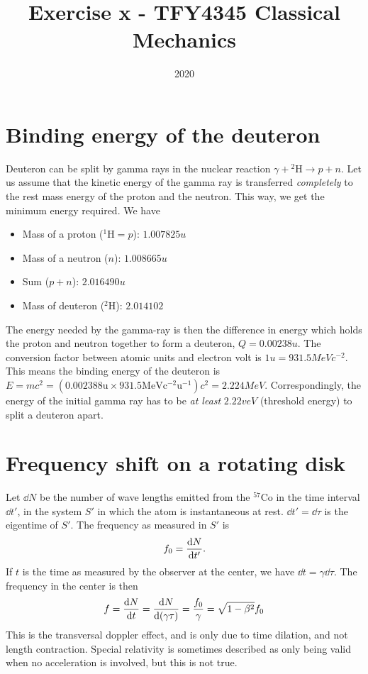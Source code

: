 \documentclass{article}
\title{Exercise x - TFY4345 Classical Mechanics}
\date{2020}
\begin{document}
    \maketitle
    \section{Binding energy of the deuteron}
        Deuteron can be split by gamma rays in the nuclear reaction $\gamma + {^2\mathrm{H}} \rightarrow p + n$. Let us assume that the kinetic energy of the gamma ray is transferred \emph{completely} to the rest mass energy of the proton and the neutron. This way, we get the minimum energy required. We have
        \begin{itemize}
            \item Mass of a proton ($^1\mathrm{H} = p$): $1.007825 \si{u}$
            \item Mass of a neutron ($n$): $1.008665 \si{u}$
            \item Sum ($p + n$): $2.016490 \si{u}$
            \item Mass of deuteron ($^2 \mathrm{H}$): $2.014102$
        \end{itemize}
        The energy needed by the gamma-ray is then the difference in energy which holds the proton and neutron together to form a deuteron, $Q=0.00238 \si{u}$. The conversion factor between atomic units and electron volt is $1 \si{u} = 931.5 \si{MeV c^{-2}}$. This means the binding energy of the deuteron is $E = mc^2 = (0.002388 \mathrm{u} \times 931.5 \mathrm{MeV c^{-2} u^{-1}})c^2 = 2.224 \si{MeV}$. Correspondingly, the energy of the initial gamma ray has to be \emph{at least} $2.22v \si{eV}$ (threshold energy) to split a deuteron apart.

    \section{Frequency shift on a rotating disk}
        Let $\dd N$ be the number of wave lengths emitted from the $^{57}\mathrm{Co}$ in the time interval $\dd t'$, in the system $S'$ in which the atom is instantaneous at rest. $\dd t' = \dd \tau$ is the eigentime of $S'$. The frequency as measured in $S'$ is
        \begin{equation*}
            f_0 = \dv{N}{t'}.
        \end{equation*}
        If $t$ is the time as measured by the observer at the center, we have $\dd t = \gamma \dd \tau$. The frequency in the center is then
        \begin{equation}
            f = \dv{N}{t} = \dv{N}{(\gamma \tau)} = \frac{f_0}{\gamma} = \sqrt{1 - \beta^2}f_0
        \end{equation}
        This is the transversal doppler effect, and is only due to time dilation, and not length contraction. Special relativity is sometimes described as only being valid when no acceleration is involved, but this is not true. 
\end{document}
